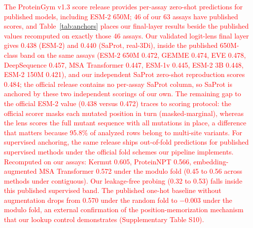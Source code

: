 \documentclass[numbered,webpdf,modern,large]{oup-authoring-template}
\newcommand{\rev}[1]{\textcolor{red}{#1}}
\begin{document}
\rev{The ProteinGym v1.3 score release provides per-assay zero-shot
predictions for published models, including ESM-2 650M; 46 of our 63
assays have published scores, and Table~\ref{tab:anchors} places our
final-layer results beside the published values recomputed on exactly
those 46 assays. Our validated logit-lens final layer gives 0.438 (ESM-2)
and 0.440 (SaProt, real-3Di), inside the published 650M-class band on the
same assays (ESM-2 650M 0.472, GEMME 0.474, EVE 0.478, DeepSequence
0.457, MSA Transformer 0.447, ESM-1v 0.445, ESM-2 3B 0.448, ESM-2 150M
0.421), and our independent SaProt zero-shot reproduction scores 0.484;
the official release contains no per-assay SaProt column, so SaProt is
anchored by these two independent scorings of our own. The remaining gap
to the official ESM-2 value (0.438 versus 0.472) traces to scoring
protocol: the official scorer masks each mutated position in turn
(masked-marginal), whereas the lens scores the full mutant sequence with
all mutations in place, a difference that matters because 95.8\% of
analyzed rows belong to multi-site variants. For supervised anchoring,
the same release ships out-of-fold predictions for published supervised
methods under the official fold schemes our pipeline implements.
Recomputed on our assays: Kermut 0.605, ProteinNPT 0.566,
embedding-augmented MSA Transformer 0.572 under the modulo fold (0.45 to
0.56 across methods under contiguous). Our leakage-free probing (0.32 to
0.53) falls inside this published supervised band. The published
one-hot baseline without augmentation drops from 0.570 under the random
fold to $-0.003$ under the modulo fold, an external confirmation of the
position-memorization mechanism that our lookup control demonstrates
(Supplementary Table S10).}
\end{document}
